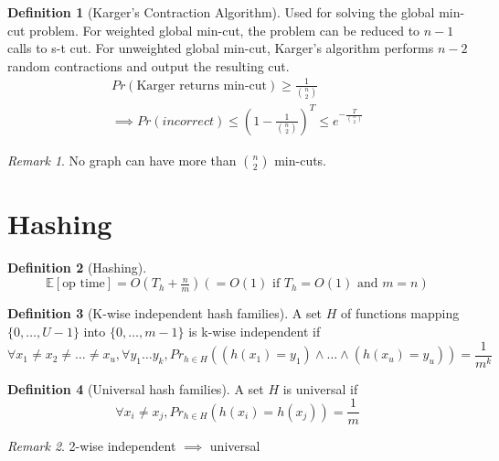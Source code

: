 \documentclass[11pt]{article}
\theoremstyle{definition}
\newtheorem{definition}{Definition}[section]
\theoremstyle{remark}
\newtheorem*{remark}{Remark}
\begin{document}
\begin{definition}[Karger's Contraction Algorithm]
Used for solving the global min-cut problem. For weighted global min-cut, the problem can be reduced to $n-1$ calls to s-t cut. For unweighted global min-cut, Karger's algorithm performs $n-2$ random contractions and output the resulting cut.
\begin{align*}
Pr(\text{Karger returns min-cut}) \geq \frac{1}{\binom{n}{2}} \\
\implies Pr(incorrect) \leq \left(1-\frac{1}{\binom{n}{2}}\right)^T \leq e^{-\frac{T}{\binom{n}{2}}}
\end{align*}

\begin{remark}
No graph can have more than $\binom{n}{2}$ min-cuts.
\end{remark}
\end{definition}
\clearpage

\section{Hashing}
\begin{definition}[Hashing]
\[
\mathbb{E}[\text{op time}] = O\left(T_h + \tfrac{n}{m}\right) (= O(1) \text{ if $T_h=O(1)$ and $m=n$})
\]
\end{definition}

\begin{definition}[K-wise independent hash families]
A set $H$ of functions mapping $\{ 0,\dots, U-1 \}$ into $\{ 0,\dots, m-1 \}$ is k-wise independent if
\[
\forall x_1\neq x_2\neq\dots\neq x_u, \forall y_1\dots y_k, {Pr}_{h\in H}\left( (h(x_1)=y_1) \wedge \dots \wedge (h(x_u)=y_u)      \right) = \frac{1}{m^k}
\]
\end{definition}

\begin{definition}[Universal hash families]
A set $H$ is universal if
\[
\forall x_i \neq x_j, {Pr}_{h\in H} (h(x_i)=h(x_j)) = \frac{1}{m}
\]
\end{definition}

\begin{remark}
2-wise independent $\implies$ universal
\end{remark}
\end{document}
